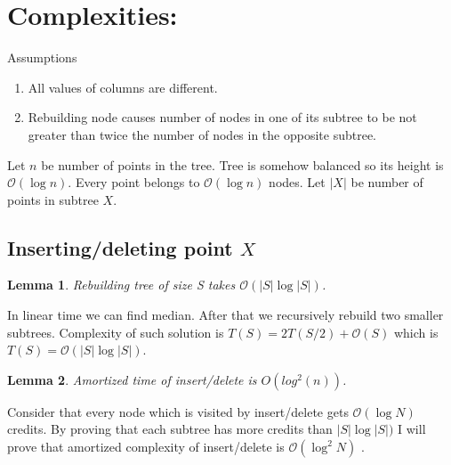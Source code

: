 \documentclass[10pt,a4paper]{article}
\newtheorem{lemma}{Lemma}
\newcommand{\Oh}{\mathcal{O}}
\begin{document}
\section{Complexities:}

Assumptions
\begin{enumerate}
\item All values of columns are different.
\item Rebuilding node causes number of nodes in one of its subtree to be not greater than twice the number of nodes in the opposite subtree.
\end{enumerate}

Let $n$ be number of points in the tree. Tree is somehow balanced so its height is $\Oh(\log n)$. Every point belongs to $\Oh(\log n)$ nodes. Let $|X|$ be number of points in subtree $X$.

\subsection{Inserting/deleting point $X$}
\begin{lemma}\label{lem:1}
Rebuilding tree of size S takes $\Oh(|S| \log |S|)$.
\end{lemma}

In linear time we can find median. After that we recursively rebuild two smaller subtrees. Complexity of such solution is $T(S) = 2 T(S/2) + \Oh(S)$ which is $T(S) = \Oh(|S| \log |S|).$

\begin{lemma}\label{lem:2}
Amortized time of insert/delete is $O(log^2 (n))$.
\end{lemma}

Consider that every node which is visited by insert/delete gets $\Oh(\log N)$ credits. By proving that each subtree has more credits than $|S| \log |S|)$ I will prove that amortized complexity of insert/delete is $\Oh(\log^2{N})$ .
\end{document}
